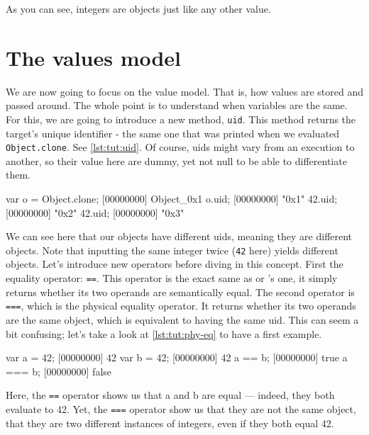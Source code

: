 As you can see, integers are objects just like any other value.

\section{The \us values model}

We are now going to focus on the \us value model. That is, how
values are stored and passed around. The whole point is to understand
when variables are the same. For this, we are going to introduce a new
method, \lstinline{uid}. This method returns the target's unique
identifier - the same one that was printed when we evaluated
\lstinline|Object.clone|. See \autoref{lst:tut:uid}. Of course, uids might vary
from an execution to another, so their value here are dummy, yet not
null to be able to differentiate them.

\begin{urbiscript}[caption=Uids, label=lst:tut:uid]
var o = Object.clone;
[00000000] Object_0x1
o.uid;
[00000000] "0x1"
42.uid;
[00000000] "0x2"
42.uid;
[00000000] "0x3"
\end{urbiscript}

We can see here that our objects have different uids, meaning they are
different objects. Note that inputting the same integer twice
(\lstinline{42} here) yields different objects. Let's introduce new
operators before diving in this concept. First the equality operator:
\lstinline{==}. This operator is the exact same as \C or \Cxx's one, it
simply returns whether its two operands are semantically equal. The
second operator is \lstinline{===}, which is the physical equality
operator. It returns whether its two operands are the same object,
which is equivalent to having the same uid. This can seem a bit
confusing; let's take a look at \autoref{lst:tut:phy-eq} to have a first example.

\begin{urbiscript}[caption=Physical equality operator,
label=lst:tut:phy-eq]
var a = 42;
[00000000] 42
var b = 42;
[00000000] 42
a == b;
[00000000] true
a === b;
[00000000] false
\end{urbiscript}

Here, the \lstinline{==} operator shows us that a and b are equal ---
indeed, they both evaluate to 42. Yet, the \lstinline{===} operator show
us that they are not the same object, that they are two different
instances of integers, even if they both equal 42.

